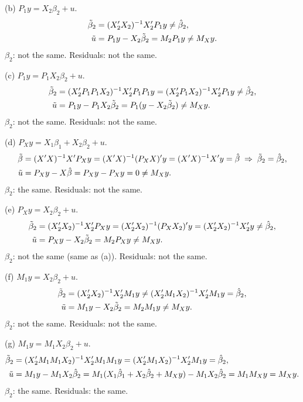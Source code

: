 \documentclass[11pt]{article}
\begin{document}
\medskip\noindent(b) $P_{1}y = X_{2}\beta_{2} + u$.
\begin{align*}
  \tilde\beta_{2} &= (X_{2}^{\prime} X_{2})^{-1}X_{2}^{\prime} P_{1}y \neq \hat\beta_{2},\\
  \tilde u &= P_{1}y - X_{2}\tilde\beta_{2} = M_{2}P_{1}y \neq M_{X}y.
\end{align*}
$\beta_{2}$: not the same. Residuals: not the same.

\medskip\noindent(c) $P_{1}y = P_{1}X_{2}\beta_{2} + u$.
\begin{align*}
  \tilde\beta_{2} &= (X_{2}^{\prime} P_{1}P_{1}X_{2})^{-1}X_{2}^{\prime} P_{1}P_{1}y = (X_{2}^{\prime} P_{1}X_{2})^{-1}X_{2}^{\prime} P_{1}y \neq \hat\beta_{2},\\
  \tilde u &= P_{1}y - P_{1}X_{2}\tilde\beta_{2} = P_{1}(y - X_{2}\tilde\beta_{2}) \neq M_{X}y.
\end{align*}
$\beta_{2}$: not the same. Residuals: not the same.

\medskip\noindent(d) $P_{X}y = X_{1}\beta_{1} + X_{2}\beta_{2} + u$.
\begin{align*}
  \tilde\beta &= (X^{\prime} X)^{-1}X^{\prime} P_{X}y = (X^{\prime} X)^{-1}(P_{X}X)^{\prime} y = (X^{\prime} X)^{-1}X^{\prime} y = \hat\beta
  \;\Rightarrow\; \tilde\beta_{2} = \hat\beta_{2},\\
  \tilde u &= P_{X}y - X\hat\beta = P_{X}y - P_{X}y = 0 \neq M_{X}y.
\end{align*}
$\beta_{2}$: the same. Residuals: not the same.

\medskip\noindent(e) $P_{X}y = X_{2}\beta_{2} + u$.
\begin{align*}
  \tilde\beta_{2} &= (X_{2}^{\prime} X_{2})^{-1}X_{2}^{\prime} P_{X}y = (X_{2}^{\prime} X_{2})^{-1}(P_{X}X_{2})^{\prime} y = (X_{2}^{\prime} X_{2})^{-1}X_{2}^{\prime} y \neq \hat\beta_{2},\\
  \tilde u &= P_{X}y - X_{2}\tilde\beta_{2} = M_{2}P_{X}y \neq M_{X}y.
\end{align*}
$\beta_{2}$: not the same (same as (a)). Residuals: not the same.

\medskip\noindent(f) $M_{1}y = X_{2}\beta_{2} + u$.
\begin{align*}
  \tilde\beta_{2} &= (X_{2}^{\prime} X_{2})^{-1}X_{2}^{\prime} M_{1}y \neq (X_{2}^{\prime} M_{1}X_{2})^{-1}X_{2}^{\prime} M_{1}y = \hat\beta_{2},\\
  \tilde u &= M_{1}y - X_{2}\tilde\beta_{2} = M_{2}M_{1}y \neq M_{X}y.
\end{align*}
$\beta_{2}$: not the same. Residuals: not the same.

\medskip\noindent(g) $M_{1}y = M_{1}X_{2}\beta_{2} + u$.
\begin{align*}
  \tilde\beta_{2} &= (X_{2}^{\prime} M_{1}M_{1}X_{2})^{-1}X_{2}^{\prime} M_{1}M_{1}y = (X_{2}^{\prime} M_{1}X_{2})^{-1}X_{2}^{\prime} M_{1}y = \hat\beta_{2},\\
  \tilde u &= M_{1}y - M_{1}X_{2}\hat\beta_{2}
  = M_{1}(X_{1}\hat\beta_{1} + X_{2}\hat\beta_{2} + M_{X}y) - M_{1}X_{2}\hat\beta_{2}
  = M_{1}M_{X}y = M_{X}y.
\end{align*}
$\beta_{2}$: the same. Residuals: the same.
\end{document}
